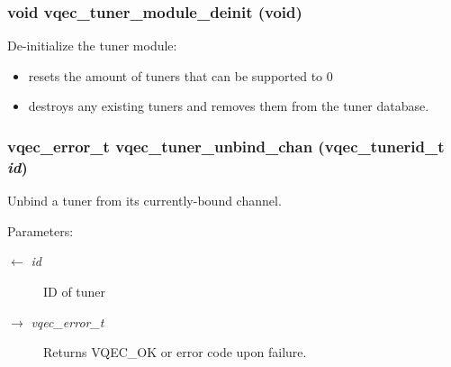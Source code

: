 \subsubsection{\setlength{\rightskip}{0pt plus 5cm}void vqec\_\-tuner\_\-module\_\-deinit (void)}\label{vqec__tuner_8h_f557c20fa23f544bc59b651472fafbb0}


De-initialize the tuner module:\begin{itemize}
\item resets the amount of tuners that can be supported to 0\item destroys any existing tuners and removes them from the tuner database. \end{itemize}
\subsubsection{\setlength{\rightskip}{0pt plus 5cm}vqec\_\-error\_\-t vqec\_\-tuner\_\-unbind\_\-chan (vqec\_\-tunerid\_\-t {\em id})}\label{vqec__tuner_8h_9d115c328b5683c645bcdd30f3224085}


Unbind a tuner from its currently-bound channel.

\begin{Desc}
\item[Parameters:]
\begin{description}
\item[\mbox{$\leftarrow$} {\em id}]ID of tuner \item[\mbox{$\rightarrow$} {\em vqec\_\-error\_\-t}]Returns VQEC\_\-OK or error code upon failure. \end{description}
\end{Desc}
